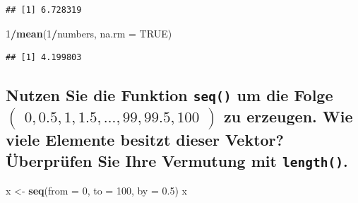 \documentclass[12pt,a4paper]{article}
\newenvironment{Shaded}{\begin{snugshade}}{\end{snugshade}}
\newcommand{\AttributeTok}[1]{\textcolor[rgb]{0.13,0.29,0.53}{#1}}
\newcommand{\ConstantTok}[1]{\textcolor[rgb]{0.56,0.35,0.01}{#1}}
\newcommand{\DecValTok}[1]{\textcolor[rgb]{0.00,0.00,0.81}{#1}}
\newcommand{\FloatTok}[1]{\textcolor[rgb]{0.00,0.00,0.81}{#1}}
\newcommand{\FunctionTok}[1]{\textcolor[rgb]{0.13,0.29,0.53}{\textbf{#1}}}
\newcommand{\NormalTok}[1]{#1}
\newcommand{\OtherTok}[1]{\textcolor[rgb]{0.56,0.35,0.01}{#1}}
\newcommand{\SpecialCharTok}[1]{\textcolor[rgb]{0.81,0.36,0.00}{\textbf{#1}}}
\begin{document}
\begin{verbatim}
## [1] 6.728319
\end{verbatim}

\begin{Shaded}
\begin{Highlighting}[]
    \DecValTok{1}\SpecialCharTok{/}\FunctionTok{mean}\NormalTok{(}\DecValTok{1}\SpecialCharTok{/}\NormalTok{numbers, }\AttributeTok{na.rm =} \ConstantTok{TRUE}\NormalTok{)}
\end{Highlighting}
\end{Shaded}

\begin{verbatim}
## [1] 4.199803
\end{verbatim}

\vspace{0.5cm}

\subsection{\texorpdfstring{Nutzen Sie die Funktion \texttt{seq()} um
die Folge
\linebreak \(\begin{pmatrix} 0, 0.5, 1, 1.5, \ldots, 99, 99.5, 100 \end{pmatrix}\)
zu erzeugen. Wie viele Elemente besitzt dieser Vektor? Überprüfen Sie
Ihre Vermutung mit
\texttt{length()}.}{Nutzen Sie die Funktion  um die Folge \textbackslash begin\{pmatrix\} 0, 0.5, 1, 1.5, \textbackslash ldots, 99, 99.5, 100 \textbackslash end\{pmatrix\} zu erzeugen. Wie viele Elemente besitzt dieser Vektor? Überprüfen Sie Ihre Vermutung mit .}}\label{nutzen-sie-die-funktion-um-die-folge-beginpmatrix-0-0.5-1-1.5-ldots-99-99.5-100-endpmatrix-zu-erzeugen.-wie-viele-elemente-besitzt-dieser-vektor-uxfcberpruxfcfen-sie-ihre-vermutung-mit-.}

\begin{Shaded}
\begin{Highlighting}[]
\NormalTok{    x }\OtherTok{\textless{}{-}} \FunctionTok{seq}\NormalTok{(}\AttributeTok{from =} \DecValTok{0}\NormalTok{, }\AttributeTok{to =} \DecValTok{100}\NormalTok{, }\AttributeTok{by =} \FloatTok{0.5}\NormalTok{)}
\NormalTok{    x}
\end{Highlighting}
\end{Shaded}
\end{document}
